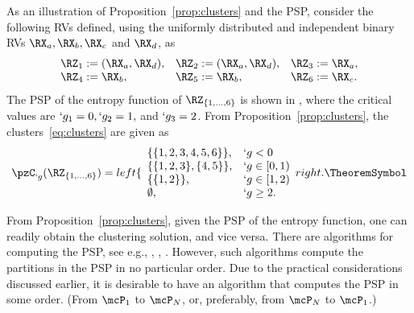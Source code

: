 \begin{example}
	\label{eg:psp}
	As an illustration of Proposition~\ref{prop:clusters} and the PSP, consider the following RVs
	defined, using the uniformly distributed and independent binary RVs $\RX_a, \RX_b, \RX_c$ and
	$\RX_d$, as
	\begin{align}
		\label{eq:eg-motivate}
		\begin{array}{lll}
			\RZ_1:=(\RX_a,\RX_d), &\RZ_2:=(\RX_a,\RX_d), &\RZ_3:=\RX_a, 
			\\
			\RZ_4:=\RX_b, &\RZ_5:=\RX_b, &\RZ_6:=\RX_c. 
		\end{array}
	\end{align}
	The PSP of the entropy function of $\RZ_{\{1,\dots,6\}}$ is shown in , where the critical values are 
	$	`g_1 = 0, `g_2 = 1,$ and $`g_3 = 2$. %
	From Proposition~\ref{prop:clusters}, the clusters~\eqref{eq:clusters} are given as
	\begin{align}
		\label{eq:eg-clusters}
		\pzC_{`g}(\RZ_{\{1,\ldots,6\}}) = \left\{
			\begin{array}{ll}
				\{\{1,2,3,4,5,6\}\}, 		& `g < 0 \\
				\{\{1,2,3\},\{4,5\}\}, 	& `g \in [0,1) \\
				\{\{1,2\}\},			 	& `g \in [1,2) \\
				\emptyset,				 	& `g \geq 2.
			\end{array}
			\right.\TheoremSymbol
	\end{align}
\end{example}

From Proposition~\ref{prop:clusters}, given the PSP of the entropy function, one can readily obtain the clustering
solution, and vice versa.
There are algorithms for computing the PSP, see e.g.,
\cite[Algorithm~3]{chan16cluster}, \cite[Ch.~13]{narayanan:book}, \cite{nagano10}. However, such algorithms
compute the partitions in the PSP in no particular order. Due to the practical considerations
discussed earlier, it is desirable to have an algorithm that computes the PSP in some order. 
(From $\mcP_1$ to $\mcP_N$, or, preferably, from $\mcP_{N}$ to $\mcP_{1}$.) 



